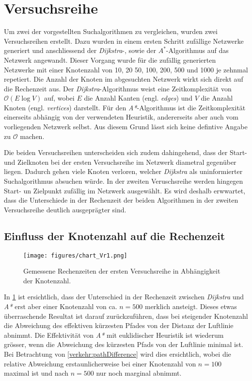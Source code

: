 \section{Versuchsreihe}
\label{section:verkehr/versuchsreihe}

Um zwei der vorgestellten Suchalgorithmen zu vergleichen, wurden zwei Versuchsreihen erstellt. Dazu wurden in einem ersten Schritt zufällige Netzwerke generiert und anschliessend der \emph{Dijkstra}-, sowie der \emph{$A^*$}-Algorithmus auf das Netzwerk angewandt.
Dieser Vorgang wurde für die zufällig generierten Netzwerke mit einer Knotenzahl von 10, 20 50, 100, 200, 500 und 1000 je zehnmal repetiert.
Die Anzahl der Knoten im abgesuchten Netzwerk wirkt sich direkt auf die Rechenzeit aus. Der \emph{Dijkstra}-Algorithmus weist eine Zeitkomplexität von $\mathcal{O}(E\log{}V)$ auf, wobei $E$ die Anzahl Kanten (engl. \emph{edges}) und $V$ die Anzahl Knoten (engl. \emph{vertices}) darstellt.
Für den \emph{A*}-Algorithmus ist die Zeitkomplexität einerseits abhängig von der verwendeten Heuristik, andererseits aber auch vom vorliegenden Netzwerk selbst. Aus diesem Grund lässt sich keine defintive Angabe zu $\mathcal{O}$ machen.

Die beiden Versuchsreihen unterscheiden sich zudem dahingehend, dass der Start- und Zielknoten bei der ersten Versuchsreihe im Netzwerk diametral gegenüber liegen. Dadurch gehen viele Knoten verloren, welcher \emph{Dijkstra} als uninformierter Suchalgorithmus absuchen würde. In der zweiten Veruschsreihe werden hingegen Start- un Zielpunkt zufällig im Netzwerk ausgewählt. Es wird deshalb erwwartet, dass die Unterschiede in der Rechenzeit der beiden Algorithmen in der zweiten Versuchsreihe deutlich ausgeprägter sind.

\subsection{Einfluss der Knotenzahl auf die Rechenzeit}
\label{verkehr:Knotenzahl}

\begin{figure}
\centering
\texttt{[image: figures/chart\_Vr1.png]}

\caption{Gemessene Rechenzeiten der ersten Versuchsreihe in Abhängigkeit der Knotenzahl.}
\label{verkehr:Vr1}
\end{figure}

In \ref{verkehr:Vr1} ist ersichtlich, dass der Unterschied in der Rechenzeit zwischen \emph{Dijkstra} und \emph{A*} erst aber einer Knotenzahl von ca. $n=500$ merklich ansteigt. Dieses etwas überraschende Resultat ist darauf zurückzuführen, dass bei steigender Knotenzahl die Abweichung des effektiven kürzesten Pfades von der Distanz der Luftlinie abnimmt.
Die Effektivität von \emph{A*} mit euklidischer Heuristik ist wiederum grösser, wenn die Abweichung des kürzesten Pfads von der Luftlinie minimal ist.
Bei Betrachtung von \ref{verkehr:pathDifference} wird dies ersichtlich, wobei die relative Abweichung erstaunlicherweise bei einer Knotenzahl von $n=100$ maximal ist und nach $n=500$ nur noch marginal abnimmt.

